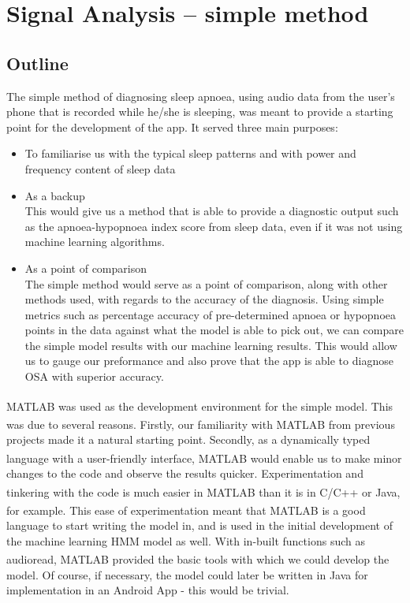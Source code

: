 \section{Signal Analysis -- simple method}
\label{sec:simple-sachin}

\subsection{Outline}

The simple method of diagnosing sleep apnoea, using audio data from the user's phone that is recorded while he/she is sleeping, was meant to provide a starting point for the development of the app. It served three main purposes:

\begin{itemize}
\item To familiarise us with the typical sleep patterns and with power and frequency content of sleep data
\item As a backup\\
This would give us a method that is able to provide a diagnostic output such as the apnoea-hypopnoea index score from sleep data, even if it was not using machine learning algorithms. 
\item As a point of comparison\\
The simple method would serve as a point of comparison, along with other methods used, with regards to the accuracy of the diagnosis. Using simple metrics such as percentage accuracy of pre-determined apnoea or hypopnoea points in the data against what the model is able to pick out, we can compare the simple model results with our machine learning results. This would allow us to gauge our preformance and also prove that the app is able to diagnose OSA with superior accuracy.
\end{itemize}

MATLAB\textsuperscript{\textregistered{}} was used as the development environment for the simple model. This was due to several reasons. Firstly, our familiarity with MATLAB\textsuperscript{\textregistered{}} from previous projects made it a natural starting point. Secondly, as a dynamically typed language with a user-friendly interface, MATLAB\textsuperscript{\textregistered{}} would enable us to make minor changes to the code and observe the results quicker. Experimentation and tinkering with the code is much easier in MATLAB\textsuperscript{\textregistered{}}  than it is in C/C++ or Java, for example. This ease of experimentation meant that MATLAB\textsuperscript{\textregistered{}} is a good language to start writing the model in, and is used in the initial development of the machine learning HMM model as well. With in-built functions such as audioread, MATLAB\textsuperscript{\textregistered{}}  provided the basic tools with which we could develop the model. Of course, if necessary, the model could later be written in Java for implementation in an Android App - this would be trivial.

